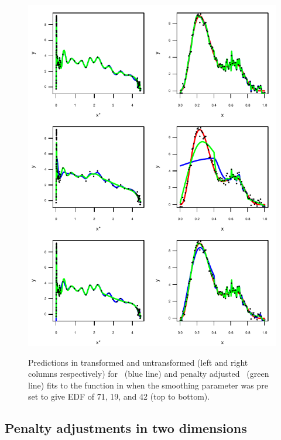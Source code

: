{%
\begin{figure}
\centering
\includegraphics[width=5.5in]{mds/figs/1dedfdia.pdf} \\
\caption{Predictions in transformed and untransformed (left and right columns respectively) for \tprs\ (blue line) and penalty adjusted \tprs\ (green line) fits to the function in  when the smoothing parameter was pre set to give EDF of 71, 19, and 42 (top to bottom).}
\label{1dedfdia}
\end{figure}


\subsection{Penalty adjustments in two dimensions}

}
